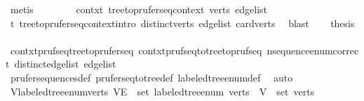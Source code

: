 \begin{isabellebody}
\ metis\isanewline
\ \ \isanewline
\ \ \isamarkupfalse%
\ \isamarkupfalse%
\ contxt{\isacharcolon}{\kern0pt}\ tree{\isacharunderscore}{\kern0pt}to{\isacharunderscore}{\kern0pt}prufer{\isacharunderscore}{\kern0pt}seq{\isacharunderscore}{\kern0pt}context\ verts\ {\isacharquery}{\kern0pt}edge{\isacharunderscore}{\kern0pt}list\ \isamarkupfalse%
\ t\ tree{\isacharunderscore}{\kern0pt}to{\isacharunderscore}{\kern0pt}prufer{\isacharunderscore}{\kern0pt}seq{\isacharunderscore}{\kern0pt}context{\isachardot}{\kern0pt}intro\ distinct{\isacharunderscore}{\kern0pt}verts\ edge{\isacharunderscore}{\kern0pt}list\ card{\isacharunderscore}{\kern0pt}verts\ \isamarkupfalse%
\ blast\isanewline
\ \ \isamarkupfalse%
\ {\isacharquery}{\kern0pt}thesis\isanewline
\ \ \ \ \isamarkupfalse%
\ contxt{\isachardot}{\kern0pt}pruf{\isacharunderscore}{\kern0pt}seq{\isacharunderscore}{\kern0pt}tree{\isacharunderscore}{\kern0pt}to{\isacharunderscore}{\kern0pt}prufer{\isacharunderscore}{\kern0pt}seq\ contxt{\isachardot}{\kern0pt}pruf{\isacharunderscore}{\kern0pt}seq{\isacharunderscore}{\kern0pt}to{\isacharunderscore}{\kern0pt}tree{\isacharunderscore}{\kern0pt}to{\isacharunderscore}{\kern0pt}pruf{\isacharunderscore}{\kern0pt}seq\ n{\isacharunderscore}{\kern0pt}sequence{\isacharunderscore}{\kern0pt}enum{\isacharunderscore}{\kern0pt}correct\ distinct{\isacharunderscore}{\kern0pt}edge{\isacharunderscore}{\kern0pt}list\ edge{\isacharunderscore}{\kern0pt}list\isanewline
\ \ \ \ \isamarkupfalse%
\ prufer{\isacharunderscore}{\kern0pt}sequences{\isacharunderscore}{\kern0pt}def\ prufer{\isacharunderscore}{\kern0pt}seq{\isacharunderscore}{\kern0pt}to{\isacharunderscore}{\kern0pt}tree{\isacharunderscore}{\kern0pt}def\ labeled{\isacharunderscore}{\kern0pt}tree{\isacharunderscore}{\kern0pt}enum{\isacharunderscore}{\kern0pt}def\ \isamarkupfalse%
\ auto\isanewline
{}\isamarkupfalse%
%
\endisatagproof
{\isafoldproof}%
%
\isadelimproof
\isanewline
%
\endisadelimproof
\isanewline
{}\isamarkupfalse%
\ V{\isacharunderscore}{\kern0pt}labeled{\isacharunderscore}{\kern0pt}tree{\isacharunderscore}{\kern0pt}enum{\isacharunderscore}{\kern0pt}verts{\isacharcolon}{\kern0pt}\ {\isachardoublequoteopen}{\isacharparenleft}{\kern0pt}V{\isacharcomma}{\kern0pt}E{\isacharparenright}{\kern0pt}\ {\isasymin}\ set\ {\isacharparenleft}{\kern0pt}labeled{\isacharunderscore}{\kern0pt}tree{\isacharunderscore}{\kern0pt}enum\ verts{\isacharparenright}{\kern0pt}\ {\isasymLongrightarrow}\ V\ {\isacharequal}{\kern0pt}\ set\ verts{\isachardoublequoteclose}\isanewline

\end{isabellebody}
